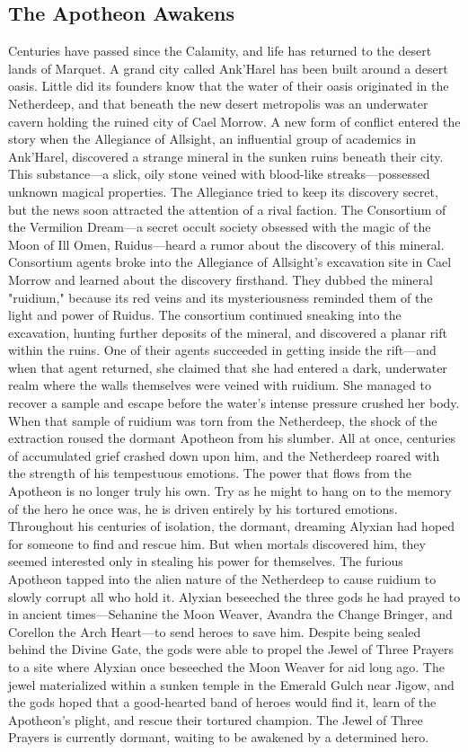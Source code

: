 \documentclass[10pt,a4,twoside,twocolumn,openany,nodeprecatedcode]{dndbook}
\begin{document}
\subsection{The Apotheon Awakens}
Centuries have passed since the Calamity, and life has returned to the desert lands of Marquet. A grand city called Ank'Harel has been built around a desert oasis. Little did its founders know that the water of their oasis originated in the Netherdeep, and that beneath the new desert metropolis was an underwater cavern holding the ruined city of Cael Morrow.
A new form of conflict entered the story when the Allegiance of Allsight, an influential group of academics in Ank'Harel, discovered a strange mineral in the sunken ruins beneath their city. This substance—a slick, oily stone veined with blood-like streaks—possessed unknown magical properties. The Allegiance tried to keep its discovery secret, but the news soon attracted the attention of a rival faction.
The Consortium of the Vermilion Dream—a secret occult society obsessed with the magic of the Moon of Ill Omen, Ruidus—heard a rumor about the discovery of this mineral. Consortium agents broke into the Allegiance of Allsight's excavation site in Cael Morrow and learned about the discovery firsthand. They dubbed the mineral "ruidium," because its red veins and its mysteriousness reminded them of the light and power of Ruidus.
The consortium continued sneaking into the excavation, hunting further deposits of the mineral, and discovered a planar rift within the ruins. One of their agents succeeded in getting inside the rift—and when that agent returned, she claimed that she had entered a dark, underwater realm where the walls themselves were veined with ruidium. She managed to recover a sample and escape before the water's intense pressure crushed her body.
When that sample of ruidium was torn from the Netherdeep, the shock of the extraction roused the dormant Apotheon from his slumber. All at once, centuries of accumulated grief crashed down upon him, and the Netherdeep roared with the strength of his tempestuous emotions.
The power that flows from the Apotheon is no longer truly his own. Try as he might to hang on to the memory of the hero he once was, he is driven entirely by his tortured emotions. Throughout his centuries of isolation, the dormant, dreaming Alyxian had hoped for someone to find and rescue him. But when mortals discovered him, they seemed interested only in stealing his power for themselves. The furious Apotheon tapped into the alien nature of the Netherdeep to cause ruidium to slowly corrupt all who hold it.
Alyxian beseeched the three gods he had prayed to in ancient times—Sehanine the Moon Weaver, Avandra the Change Bringer, and Corellon the Arch Heart—to send heroes to save him. Despite being sealed behind the Divine Gate, the gods were able to propel the Jewel of Three Prayers to a site where Alyxian once beseeched the Moon Weaver for aid long ago. The jewel materialized within a sunken temple in the Emerald Gulch near Jigow, and the gods hoped that a good-hearted band of heroes would find it, learn of the Apotheon's plight, and rescue their tortured champion. The Jewel of Three Prayers is currently dormant, waiting to be awakened by a determined hero.
\end{document}
